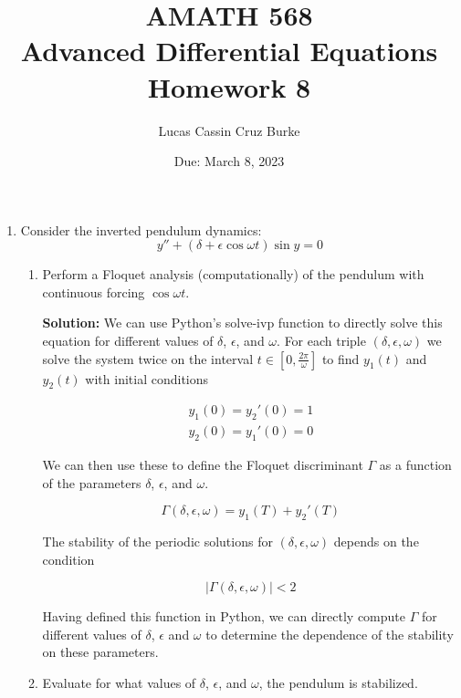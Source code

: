 \documentclass[12pt, a4paper]{article}
\begin{document}
\title{{AMATH 568\\
Advanced Differential Equations}\\
{\bf \Huge Homework 8}}

\author{Lucas Cassin Cruz Burke}

\date{Due: March 8, 2023}

\maketitle

\begin{enumerate}
    \item Consider the inverted pendulum dynamics: $$y'' + (\delta + \epsilon \cos \omega t) \sin y = 0$$
    
    \begin{enumerate}
        \item Perform a Floquet analysis (computationally) of the pendulum with continuous forcing $\cos \omega t$. 
        
        \textbf{Solution:} We can use Python's solve-ivp function to directly solve this equation for different values of $\delta$, $\epsilon$, and $\omega$. For each triple $(\delta, \epsilon, \omega)$ we solve the system twice on the interval $t\in [0, \frac{2\pi}{\omega}]$ to find $y_1(t)$ and $y_2(t)$ with initial conditions 

        \begin{align*}
            y_1(0)= y_2'(0)=1 \\ y_2(0)= y_1'(0)=0
        \end{align*}

        We can then use these to define the Floquet discriminant $\Gamma$ as a function of the parameters $\delta$, $\epsilon$, and $\omega$. 
        
        $$\Gamma(\delta, \epsilon, \omega) = y_1(T) + y_2'(T)$$ 

        The stability of the periodic solutions for $(\delta, \epsilon, \omega)$ depends on the condition 

        $$|\Gamma(\delta, \epsilon, \omega)| < 2$$

        Having defined this function in Python, we can directly compute $\Gamma$ for different values of $\delta$, $\epsilon$ and $\omega$ to determine the dependence of the stability on these parameters. 

        \item Evaluate for what values of $\delta$, $\epsilon$, and $\omega$, the pendulum is stabilized. 
        

\end{enumerate}
\end{enumerate}
\end{document}
